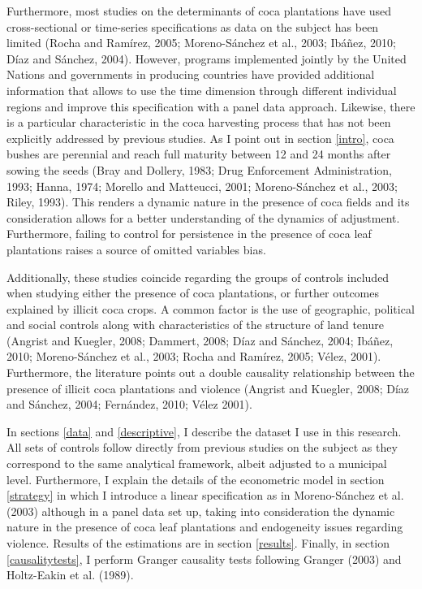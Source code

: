 \documentclass[a4paper, 12pt]{article}
\begin{document}
Furthermore, most studies on the determinants of coca plantations have used cross-sectional or time-series specifications as data on the subject has been limited (Rocha and Ram\'{i}rez, 2005; Moreno-S\'{a}nchez et al., 2003; Ib\'{a}\~{n}ez, 2010; D\'{i}az and S\'{a}nchez, 2004). However, programs implemented jointly by the United Nations and governments in producing countries have provided additional information that allows to use the time dimension through different individual regions and improve this specification with a panel data approach. Likewise, there is a particular characteristic in the coca harvesting process that has not been explicitly addressed by previous studies. As I point out in section \ref{intro}, coca bushes are perennial and reach full maturity between 12 and 24 months after sowing the seeds (Bray and Dollery, 1983; Drug Enforcement Administration, 1993; Hanna, 1974; Morello and Matteucci, 2001; Moreno-S\'{a}nchez et al., 2003; Riley, 1993). This renders a dynamic nature in the presence of coca fields and its consideration allows for a better understanding of the dynamics of adjustment. Furthermore, failing to control for persistence in the presence of coca leaf plantations raises a source of omitted variables bias.

Additionally, these studies coincide regarding the groups of controls included when studying either the presence of coca plantations, or further outcomes explained by illicit coca crops. A common factor is the use of geographic, political and social controls along with characteristics of the structure of land tenure (Angrist and Kuegler, 2008; Dammert, 2008; D\'{i}az and S\'{a}nchez, 2004; Ib\'{a}\~{n}ez, 2010; Moreno-S\'{a}nchez et al., 2003; Rocha and Ram\'{i}rez, 2005; V\'{e}lez, 2001). Furthermore, the literature points out a double causality relationship between the presence of illicit coca plantations and violence (Angrist and Kuegler, 2008; D\'{i}az and S\'{a}nchez, 2004; Fern\'{a}ndez, 2010; V\'{e}lez 2001). 

In sections \ref{data} and \ref{descriptive}, I describe the dataset I use in this research. All sets of controls follow directly from previous studies on the subject as they correspond to the same analytical framework, albeit adjusted to a municipal level. Furthermore, I explain the details of the econometric model in section \ref{strategy} in which I introduce a linear specification as in Moreno-S\'{a}nchez et al. (2003) although in a panel data set up, taking into consideration the dynamic nature in the presence of coca leaf plantations and endogeneity issues regarding violence. Results of the estimations are in section \ref{results}. Finally, in section \ref{causalitytests}, I perform Granger causality tests following Granger (2003) and Holtz-Eakin et al. (1989).
\end{document}
